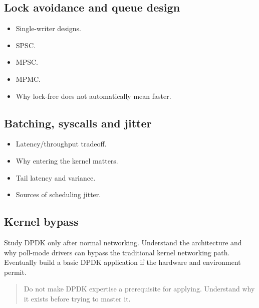 \documentclass[11pt,letterpaper]{article}
\begin{document}
\subsection*{Lock avoidance and queue design}

\begin{itemize}

\item Single-writer designs.

\item SPSC.

\item MPSC.

\item MPMC.

\item Why lock-free does not automatically mean faster.

\end{itemize}

\subsection*{Batching, syscalls and jitter}

\begin{itemize}

\item Latency/throughput tradeoff.

\item Why entering the kernel matters.

\item Tail latency and variance.

\item Sources of scheduling jitter.

\end{itemize}

\subsection*{Kernel bypass}

Study DPDK only after normal networking. Understand the architecture and why poll-mode drivers can bypass the traditional kernel networking path. Eventually build a basic DPDK application if the hardware and environment permit.

\begin{quote}
Do not make DPDK expertise a prerequisite for applying. Understand why it exists before trying to master it.
\end{quote}
\end{document}
